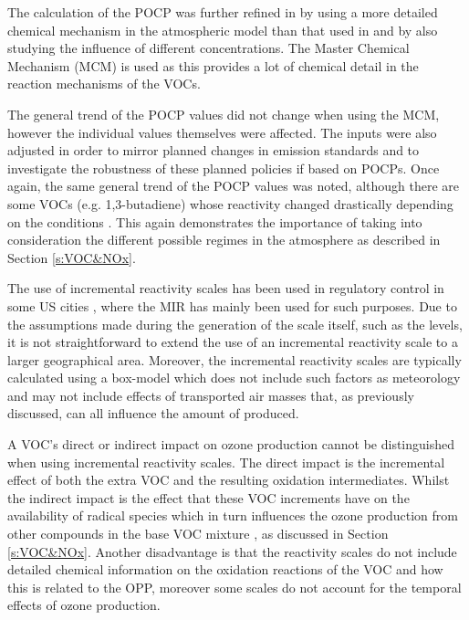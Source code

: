 The calculation of the POCP was further refined in \citep{Derwent:1998} by using a more detailed chemical mechanism in the atmospheric model than that used in \citep{Derwent:1996} and by also studying the influence of different  concentrations. 
The Master Chemical Mechanism (MCM) is used as this provides a lot of chemical detail in the reaction mechanisms of the VOCs. 

The general trend of the POCP values did not change when using the MCM, however the individual values themselves were affected.
The  inputs were also adjusted in order to mirror planned changes in  emission standards and to investigate the robustness of these planned policies if based on POCPs. 
Once again, the same general trend of the POCP values was noted, although there are some VOCs (e.g. 1,3-butadiene) whose reactivity changed drastically depending on the  conditions \citep{Derwent:1998}. 
This again demonstrates the importance of taking into consideration the different possible regimes in the atmosphere as described in Section \ref{s:VOC&NOx}.

The use of incremental reactivity scales has been used in regulatory control in some US cities \citep{Luecken:2008}, where the MIR has mainly been used for such purposes. 
Due to the assumptions made during the generation of the scale itself, such as the  levels, it is not straightforward to extend the use of an incremental reactivity scale to a larger geographical area.
Moreover, the incremental reactivity scales are typically calculated using a box-model which does not include such factors as meteorology and may not include effects of transported air masses that, as previously discussed, can all influence the amount of  produced. 

A VOC's direct or indirect impact on ozone production cannot be distinguished when using incremental reactivity scales. 
The direct impact is the incremental effect of both the extra VOC and the resulting oxidation intermediates. 
Whilst the indirect impact is the effect that these VOC increments have on the availability of radical species which in turn influences the ozone production from other compounds in the base VOC mixture \citep{Butler:2011}, as discussed in Section \ref{s:VOC&NOx}. 
Another disadvantage is that the reactivity scales do not include detailed chemical information on the oxidation reactions of the VOC and how this is related to the OPP, moreover some scales do not account for the temporal effects of ozone production.

